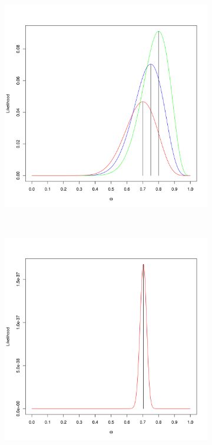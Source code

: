 \begin{figure}
\begin{subfigure}{.45\textwidth}
\includegraphics[scale=.3]{sparse_likelihood.png}
\caption{}
\label{fig:sparse_likelihood}
\end{subfigure}
~
\begin{subfigure}{.45\textwidth}
\includegraphics[scale=.3]{dense_likelihood.png}

\end{subfigure}
\end{figure}

